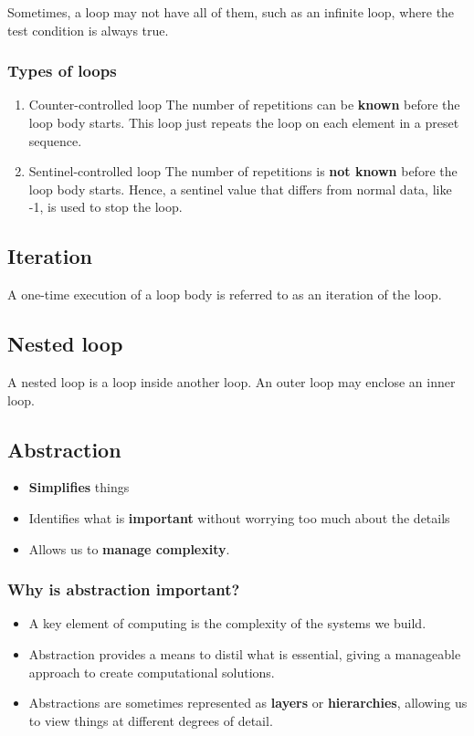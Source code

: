 \documentclass[11pt]{article}
\begin{document}
Sometimes, a loop may not have all of them, such as an infinite loop, where the test condition is always true.
\subsubsection{Types of loops}
\label{sec:org99c021d}
\begin{enumerate}
\item Counter-controlled loop
The number of repetitions can be \textbf{known} before the loop body starts. This loop just repeats the loop on each element in a preset sequence.

\item Sentinel-controlled loop
The number of repetitions is \textbf{not known} before the loop body starts. Hence, a sentinel value that differs from normal data, like -1, is used to stop the loop.
\end{enumerate}
\subsection{Iteration}
\label{sec:org82922d8}
A one-time execution of a loop body is referred to as an iteration of the loop.
\subsection{Nested loop}
\label{sec:orgdec8bcb}
A nested loop is a loop inside another loop. An outer loop may enclose an inner loop.

 \newpage
\subsection{Abstraction}
\label{sec:orgb8bf76b}
\begin{itemize}
\item \textbf{Simplifies} things
\item Identifies what is \textbf{important} without worrying too much about the details
\item Allows us to \textbf{manage complexity}.
\end{itemize}
\subsubsection{Why is abstraction important?}
\label{sec:orga7a30c9}
\begin{itemize}
\item A key element of computing is the complexity of the systems we build.
\item Abstraction provides a means to distil what is essential, giving a manageable approach to create computational solutions.
\item Abstractions are sometimes represented as \textbf{layers} or \textbf{hierarchies}, allowing us to view things at different degrees of detail.
\end{itemize}
\end{document}
